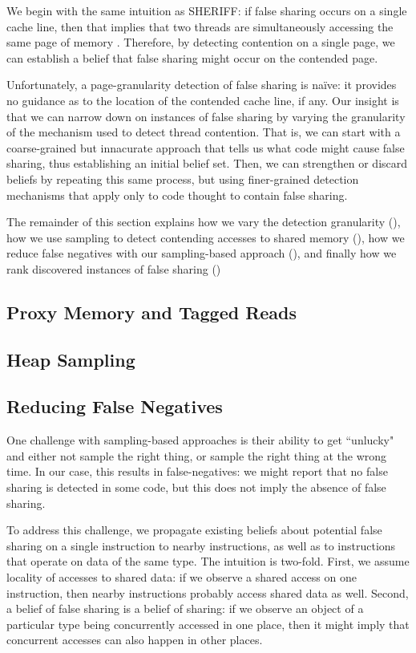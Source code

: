 \documentclass{sig-alternate}
\begin{document}
We begin with the same intuition as SHERIFF: if false sharing occurs on a single cache line, then that implies that two
threads are simultaneously accessing the same page of memory \cite{SHERIFF}. Therefore, by detecting contention on
a single page, we can establish a belief that false sharing might occur on the contended page.

Unfortunately, a page-granularity detection of false sharing is na{\"i}ve: it provides no guidance as to the location of the
contended cache line, if any. Our insight is that we can narrow down on instances of false sharing by varying the
granularity of the mechanism used to detect thread contention. That is, we can start with a coarse-grained but
innacurate approach that tells us what code might cause false sharing, thus establishing an initial belief set. Then, we
can strengthen or discard beliefs by repeating this same process, but using finer-grained detection mechanisms that
apply only to code thought to contain false sharing.

The remainder of this section explains how we vary the detection granularity (), how we use sampling
to detect contending accesses to shared memory (), how we reduce false negatives with our
sampling-based approach (), and finally how we rank discovered instances of false sharing ()

\subsection{Proxy Memory and Tagged Reads}\label{sec:proxymem}

\subsection{Heap Sampling}\label{sec:heapsample}

\subsection{Reducing False Negatives}\label{sec:falsenegs}

One challenge with sampling-based approaches is their ability to get ``unlucky" and either not sample
the right thing, or sample the right thing at the wrong time. In our case, this results in false-negatives:
we might report that no false sharing is detected in some code, but this does not imply the absence of
false sharing.

To address this challenge, we propagate existing beliefs about potential false sharing on a single instruction
to nearby instructions, as well as to instructions that operate on data of the same type. The intuition is
two-fold. First, we assume locality of accesses to shared data: if we observe a shared access on one instruction,
then nearby instructions probably access shared data as well. Second, a belief of false sharing is a belief of
sharing: if we observe an object of a particular type being concurrently accessed in one place, then it might
imply that concurrent accesses can also happen in other places.
\end{document}
